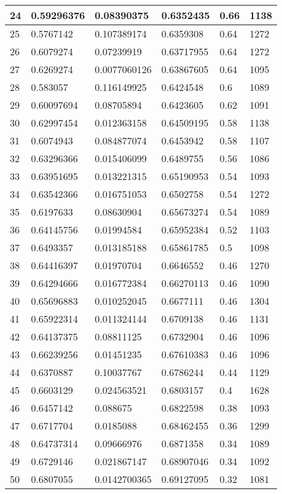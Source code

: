 \begin{longtable}{|l|l|l|l|l|l|}
24 & 0.59296376 & 0.08390375 & 0.6352435 & 0.66 & 1138 \\ \hline 
25 & 0.5767142 & 0.107389174 & 0.6359308 & 0.64 & 1272 \\ \hline 
26 & 0.6079274 & 0.07239919 & 0.63717955 & 0.64 & 1272 \\ \hline 
27 & 0.6269274 & 0.0077060126 & 0.63867605 & 0.64 & 1095 \\ \hline 
28 & 0.583057 & 0.116149925 & 0.6424548 & 0.6 & 1089 \\ \hline 
29 & 0.60097694 & 0.08705894 & 0.6423605 & 0.62 & 1091 \\ \hline 
30 & 0.62997454 & 0.012363158 & 0.64509195 & 0.58 & 1138 \\ \hline 
31 & 0.6074943 & 0.084877074 & 0.6453942 & 0.58 & 1107 \\ \hline 
32 & 0.63296366 & 0.015406099 & 0.6489755 & 0.56 & 1086 \\ \hline 
33 & 0.63951695 & 0.013221315 & 0.65190953 & 0.54 & 1093 \\ \hline 
34 & 0.63542366 & 0.016751053 & 0.6502758 & 0.54 & 1272 \\ \hline 
35 & 0.6197633 & 0.08630904 & 0.65673274 & 0.54 & 1089 \\ \hline 
36 & 0.64145756 & 0.01994584 & 0.65952384 & 0.52 & 1103 \\ \hline 
37 & 0.6493357 & 0.013185188 & 0.65861785 & 0.5 & 1098 \\ \hline 
38 & 0.64416397 & 0.01970704 & 0.6646552 & 0.46 & 1270 \\ \hline 
39 & 0.64294666 & 0.016772384 & 0.66270113 & 0.46 & 1090 \\ \hline 
40 & 0.65696883 & 0.010252045 & 0.6677111 & 0.46 & 1304 \\ \hline 
41 & 0.65922314 & 0.011324144 & 0.6709138 & 0.46 & 1131 \\ \hline 
42 & 0.64137375 & 0.08811125 & 0.6732904 & 0.46 & 1096 \\ \hline 
43 & 0.66239256 & 0.01451235 & 0.67610383 & 0.46 & 1096 \\ \hline 
44 & 0.6370887 & 0.10037767 & 0.6786244 & 0.44 & 1129 \\ \hline 
45 & 0.6603129 & 0.024563521 & 0.6803157 & 0.4 & 1628 \\ \hline 
46 & 0.6457142 & 0.088675 & 0.6822598 & 0.38 & 1093 \\ \hline 
47 & 0.6717704 & 0.0185088 & 0.68462455 & 0.36 & 1299 \\ \hline 
48 & 0.64737314 & 0.09666976 & 0.6871358 & 0.34 & 1089 \\ \hline 
49 & 0.6729146 & 0.021867147 & 0.68907046 & 0.34 & 1092 \\ \hline 
50 & 0.6807055 & 0.0142700365 & 0.69127095 & 0.32 & 1081 \\ \hline 
\end{longtable}